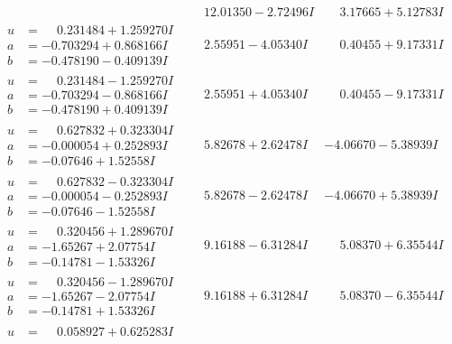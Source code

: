 \documentclass[1p]{elsarticle_modified}
\theoremstyle{definition}
\begin{document}
$$\begin{array}{c|c|c}
 & \phantom{-}12.01350 - 2.72496 I & \phantom{-}3.17665 + 5.12783 I \\ \hline\begin{aligned}
u &= \phantom{-}0.231484 + 1.259270 I \\
a &= -0.703294 + 0.868166 I \\
b &= -0.478190 - 0.409139 I\end{aligned}
 & \phantom{-}2.55951 - 4.05340 I & \phantom{-}0.40455 + 9.17331 I \\ \hline\begin{aligned}
u &= \phantom{-}0.231484 - 1.259270 I \\
a &= -0.703294 - 0.868166 I \\
b &= -0.478190 + 0.409139 I\end{aligned}
 & \phantom{-}2.55951 + 4.05340 I & \phantom{-}0.40455 - 9.17331 I \\ \hline\begin{aligned}
u &= \phantom{-}0.627832 + 0.323304 I \\
a &= -0.000054 + 0.252893 I \\
b &= -0.07646 + 1.52558 I\end{aligned}
 & \phantom{-}5.82678 + 2.62478 I & -4.06670 - 5.38939 I \\ \hline\begin{aligned}
u &= \phantom{-}0.627832 - 0.323304 I \\
a &= -0.000054 - 0.252893 I \\
b &= -0.07646 - 1.52558 I\end{aligned}
 & \phantom{-}5.82678 - 2.62478 I & -4.06670 + 5.38939 I \\ \hline\begin{aligned}
u &= \phantom{-}0.320456 + 1.289670 I \\
a &= -1.65267 + 2.07754 I \\
b &= -0.14781 - 1.53326 I\end{aligned}
 & \phantom{-}9.16188 - 6.31284 I & \phantom{-}5.08370 + 6.35544 I \\ \hline\begin{aligned}
u &= \phantom{-}0.320456 - 1.289670 I \\
a &= -1.65267 - 2.07754 I \\
b &= -0.14781 + 1.53326 I\end{aligned}
 & \phantom{-}9.16188 + 6.31284 I & \phantom{-}5.08370 - 6.35544 I \\ \hline\begin{aligned}
u &= \phantom{-}0.058927 + 0.625283 I \\

\end{aligned}
\end{array}$$
\end{document}
